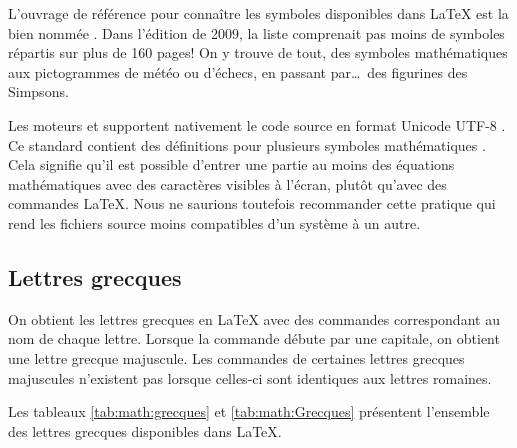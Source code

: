 L'ouvrage de référence pour connaître les symboles disponibles dans
{\LaTeX} est la bien nommée %
\citep{comprehensive}. Dans l'édition de 2009, la liste comprenait pas
moins de  symboles répartis sur plus de 160 pages! On y
trouve de tout, des symboles mathématiques aux pictogrammes de météo
ou d'échecs, en passant par\dots\ des figurines des Simpsons.

\begin{important}
  Les moteurs {\XeTeX} et {\LuaTeX} supportent nativement le code
  source en format Unicode UTF-8 \citep{Unicode:5.0}. Ce standard
  contient des définitions pour plusieurs symboles mathématiques
  \citep{wikipedia:unicode-math}. Cela signifie qu'il est possible
  d'entrer une partie au moins des équations mathématiques avec des
  caractères visibles à l'écran, plutôt qu'avec des commandes
  {\LaTeX}. Nous ne saurions toutefois recommander cette pratique qui
  rend les fichiers source moins compatibles d'un système à un autre.
\end{important}

\subsection{Lettres grecques}
\label{sec:math:symboles:grecques}

On obtient les lettres grecques en {\LaTeX} avec des commandes
correspondant au nom de chaque lettre. Lorsque la commande débute par
une capitale, on obtient une lettre grecque majuscule. Les commandes
de certaines lettres grecques majuscules n'existent pas lorsque celles-ci
sont identiques aux lettres romaines.

Les tableaux \ref{tab:math:grecques} et \ref{tab:math:Grecques}
présentent l'ensemble des lettres grecques disponibles dans {\LaTeX}.

